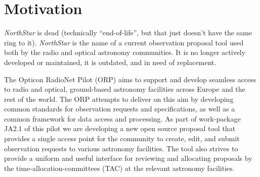 \documentclass[11pt,twoside]{article}
\begin{document}





\section{Motivation}\label{sec:motivation}
\emph{NorthStar} is dead (technically ``end-of-life'', but that just doesn't have the same ring
to it).
\emph{NorthStar} is the name of a current observation proposal tool used both by the radio and optical
astronomy communities.
It is no longer actively developed or maintained, it is outdated, and in need of replacement.

The Opticon RadioNet Pilot (ORP) aims to support and develop seamless access to radio and optical,
ground-based astronomy facilities across Europe and the rest of the world.
The ORP attempts to deliver on this aim by developing common standards for observation requests and
specifications, as well as a common framework for data access and processing.
As part of work-package JA2.1 of this pilot we are developing a new open source proposal tool that provides
a single access point for the community to create, edit, and submit observation requests to various astronomy
facilities.
The tool also strives to provide a uniform and useful interface for reviewing and allocating proposals by the
time-allocation-committees (TAC) at the relevant astronomy facilities.
\end{document}
